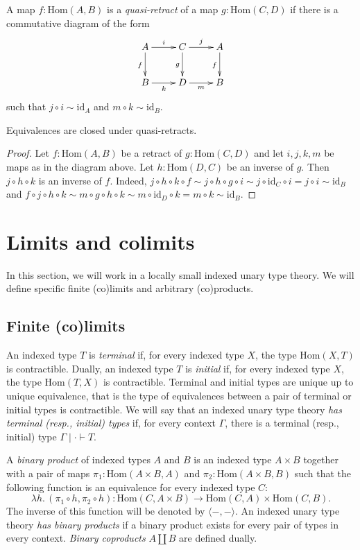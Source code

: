 \documentclass[reqno]{amsart}
\theoremstyle{definition}
\theoremstyle{remark}
\newcommand{\ob}{}
\newcommand{\fs}[1]{\mathrm{#1}}
\newcommand{\Hom}{\fs{Hom}}
\newcommand{\id}{\fs{id}}
\numberwithin{figure}{section}
\begin{document}
A map $f : \Hom(A,B)$ is a \emph{quasi-retract} of a map $g : \Hom(C,D)$ if there is a commutative diagram of the form
\[ \xymatrix{ A \ar[r]^i \ar[d]_f & C \ar[r]^j \ar[d]_g & A \ar[d]_f \\
              B \ar[r]_k          & D \ar[r]_m          & B
            } \]
such that $j \circ i \sim \id_A$ and $m \circ k \sim \id_B$.

\begin{prop}
Equivalences are closed under quasi-retracts.
\end{prop}
\begin{proof}
Let $f : \Hom(A,B)$ be a retract of $g : \Hom(C,D)$ and let $i,j,k,m$ be maps as in the diagram above.
Let $h : \Hom(D,C)$ be an inverse of $g$.
Then $j \circ h \circ k$ is an inverse of $f$.
Indeed, $j \circ h \circ k \circ f \sim j \circ h \circ g \circ i \sim j \circ \id_C \circ i = j \circ i \sim \id_B$ and
$f \circ j \circ h \circ k \sim m \circ g \circ h \circ k \sim m \circ \id_D \circ k = m \circ k \sim \id_B$.
\end{proof}

\section{Limits and colimits}

In this section, we will work in a locally small indexed unary type theory.
We will define specific finite (co)limits and arbitrary (co)products.

\subsection{Finite (co)limits}

An indexed type $T$ is \emph{terminal} if, for every indexed type $X$, the type $\Hom(X,T)$ is contractible.
Dually, an indexed type $T$ is \emph{initial} if, for every indexed type $X$, the type $\Hom(T,X)$ is contractible.
Terminal and initial types are unique up to unique equivalence, that is the type of equivalences between a pair of terminal or initial types is contractible.
We will say that an indexed unary type theory \emph{has terminal (resp., initial) types} if, for every context $\Gamma$, there is a terminal (resp., initial) type $\Gamma \mid \cdot \vdash T \ob$.

A \emph{binary product} of indexed types $A$ and $B$ is an indexed type $A \times B$ together with a pair of maps $\pi_1 : \Hom(A \times B, A)$ and $\pi_2 : \Hom(A \times B, B)$
such that the following function is an equivalence for every indexed type $C$:
\[ \lambda h.\,(\pi_1 \circ h, \pi_2 \circ h) : \Hom(C, A \times B) \to \Hom(C,A) \times \Hom(C,B). \]
The inverse of this function will be denoted by $\langle -, - \rangle$.
An indexed unary type theory \emph{has binary products} if a binary product exists for every pair of types in every context.
\emph{Binary coproducts} $A \amalg B$ are defined dually.
\end{document}
